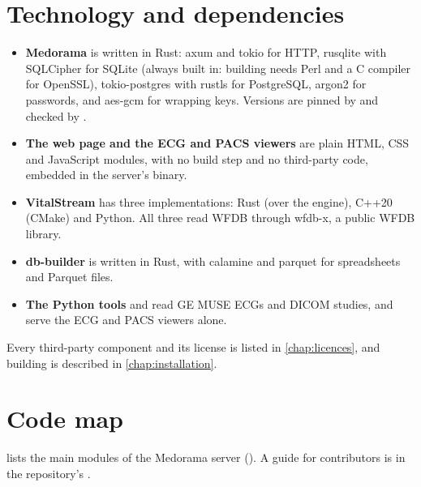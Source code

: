 \section{Technology and dependencies}
\label{sec:architecture-technology}

\begin{itemize}
\item \textbf{Medorama} is written in Rust: axum and tokio for HTTP, rusqlite with SQLCipher
  for SQLite (always built in: building needs Perl and a C compiler for OpenSSL), tokio-postgres
  with rustls for PostgreSQL, argon2 for passwords, and aes-gcm for wrapping keys. Versions are pinned by
   and checked by .
\item \textbf{The web page and the ECG and PACS viewers} are plain HTML, CSS and JavaScript
  modules, with no build step and no third-party code, embedded in the server's binary.
\item \textbf{VitalStream} has three implementations: Rust (over the engine), C++20 (CMake) and
  Python. All three read WFDB through wfdb-x, a public WFDB library.
\item \textbf{db-builder} is written in Rust, with calamine and parquet for spreadsheets and
  Parquet files.
\item \textbf{The Python tools}  and  read GE MUSE ECGs and DICOM
  studies, and serve the ECG and PACS viewers alone.
\end{itemize}
Every third-party component and its license is listed in \cref{chap:licences}, and building is
described in \cref{chap:installation}.

\section{Code map}
\label{sec:architecture-code}

 lists the main modules of the Medorama server
(). A guide for contributors is in the repository's
.

